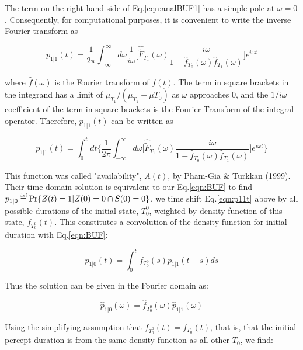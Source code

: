 The term on the right-hand side of Eq.\ref{eqn:analBUF1} has a simple pole at $\omega=0$. Consequently, for computational purposes, it is convenient to write the inverse Fourier transform as

\begin{equation}
p_{1|1}(t)=\frac{1}{2\pi}\int_{-\infty}^{\infty}d\omega\frac{1}{i\omega}\Bigg[\hat{\tilde{F}}_{T_1}(\omega)\frac{i\omega}{1-\hat{f}_{T_0}(\omega)\hat{f}_{T_1}(\omega)}\Bigg]e^{i\omega t}
\label{eqn:ifft1}
\end{equation}

where $\hat{f}(\omega)$ is the Fourier transform of $f(t)$. The term in square brackets in the integrand has a limit of $\mu_{T_1}/(\mu_{T_1} + \mu{T_0})$ as $\omega$ approaches 0, and the $1/i\omega$ coefficient of the term in square brackets is the Fourier Transform of the integral operator. Therefore, $p_{1|1}(t)$ can be written as


\begin{equation}
p_{1|1}(t)=\int_{0}^{t}dt\bigg\{\frac{1}{2\pi}\int_{-\infty}^{\infty}d\omega\Bigg[\hat{\tilde{F}}_{T_1}(\omega)\frac{i\omega}{1-\hat{f}_{T_0}(\omega)\hat{f}_{T_1}(\omega)}\Bigg]e^{i\omega t}\bigg\}
\label{eqn:p11t}
\end{equation}

This function was called "availability", $A(t)$, by Pham-Gia \& Turkkan (1999). Their time-domain solution is equivalent to our Eq.\ref{eqn:BUF} to find $p_{1|0} \defeq \text{Pr}\{Z(t)=1|Z(0)=0\cap S(0)=0\}$, we time shift Eq.\ref{eqn:p11t} above by all possible durations of the initial state, $T_0^0$, weighted by density function of this state, $f_{T_0^0}(t)$. This constitutes a convolution of the density function for initial duration with Eq.\ref{eqn:BUF}:

\begin{equation}
p_{1|0}(t)=\int_0^t f_{T_0^0}(s)p_{1|1}(t-s)ds
\label{eqn:p10t}
\end{equation}

Thus the solution can be given in the Fourier domain as:


\begin{equation}
\hat{p}_{1|0}(\omega)=\hat{f}_{T_0^0} (\omega) \hat{p}_{1|1}(\omega)
\label{p10w}
\end{equation}

Using the simplifying assumption that $f_{T_0^0}(t)=f_{T_0}(t)$, that is, that the initial percept duration is from the same density function as all other $T_0$, we find:


